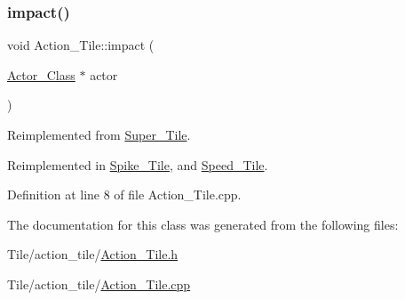 \subsubsection{\texorpdfstring{impact()}{impact()}}
{\footnotesize\ttfamily void Action\+\_\+\+Tile\+::impact (\begin{DoxyParamCaption}\item[{\hyperlink{class_actor___class}{Actor\+\_\+\+Class} $\ast$}]{actor }\end{DoxyParamCaption})\hspace{0.3cm}{\ttfamily [virtual]}}



Reimplemented from \hyperlink{class_super___tile_a7b509383d0d0ad2df0220f7dc4660823}{Super\+\_\+\+Tile}.



Reimplemented in \hyperlink{class_spike___tile_a8673c82f84733fe73c456eee725a6ab0}{Spike\+\_\+\+Tile}, and \hyperlink{class_speed___tile_aea424ba028f29398ace251a3a664b874}{Speed\+\_\+\+Tile}.



Definition at line 8 of file Action\+\_\+\+Tile.\+cpp.



The documentation for this class was generated from the following files\+:\begin{DoxyCompactItemize}
\item 
Tile/action\+\_\+tile/\hyperlink{_action___tile_8h}{Action\+\_\+\+Tile.\+h}\item 
Tile/action\+\_\+tile/\hyperlink{_action___tile_8cpp}{Action\+\_\+\+Tile.\+cpp}\end{DoxyCompactItemize}
